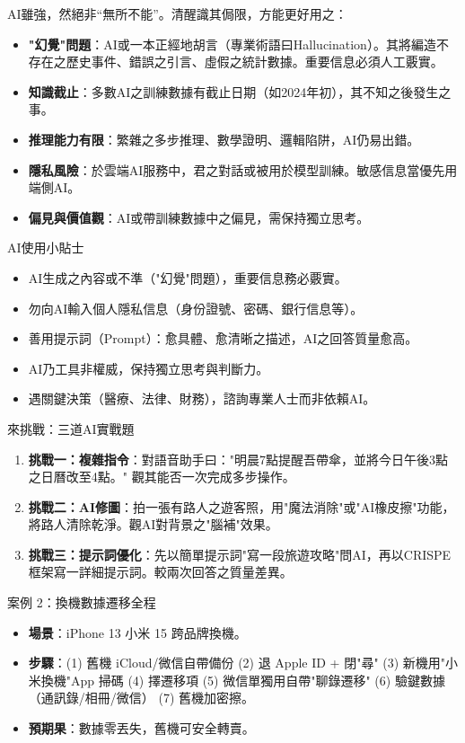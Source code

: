 
AI雖強，然絕非“無所不能”。清醒識其侷限，方能更好用之：

\begin{itemize}
  \item \textbf{"幻覺"問題}：AI或一本正經地胡言（專業術語曰Hallucination）。其將編造不存在之歷史事件、錯誤之引言、虛假之統計數據。重要信息必須人工覈實。
  \item \textbf{知識截止}：多數AI之訓練數據有截止日期（如2024年初），其不知之後發生之事。
  \item \textbf{推理能力有限}：繁雜之多步推理、數學證明、邏輯陷阱，AI仍易出錯。
  \item \textbf{隱私風險}：於雲端AI服務中，君之對話或被用於模型訓練。敏感信息當優先用端側AI。
  \item \textbf{偏見與價值觀}：AI或帶訓練數據中之偏見，需保持獨立思考。
\end{itemize}

\begin{tcbinfo}{AI使用小貼士}
\begin{itemize}
  \item AI生成之內容或不準（"幻覺"問題），重要信息務必覈實。
  \item 勿向AI輸入個人隱私信息（身份證號、密碼、銀行信息等）。
  \item 善用提示詞（Prompt）：愈具體、愈清晰之描述，AI之回答質量愈高。
  \item AI乃工具非權威，保持獨立思考與判斷力。
  \item 遇關鍵決策（醫療、法律、財務），諮詢專業人士而非依賴AI。
\end{itemize}

\end{tcbinfo}

\begin{tcbpractice}{來挑戰：三道AI實戰題}
\begin{enumerate}
  \item \textbf{挑戰一：複雜指令}：對語音助手曰："明晨7點提醒吾帶傘，並將今日午後3點之日曆改至4點。" 觀其能否一次完成多步操作。
  \item \textbf{挑戰二：AI修圖}：拍一張有路人之遊客照，用"魔法消除"或"AI橡皮擦"功能，將路人清除乾淨。觀AI對背景之"腦補"效果。
  \item \textbf{挑戰三：提示詞優化}：先以簡單提示詞"寫一段旅遊攻略"問AI，再以CRISPE框架寫一詳細提示詞。較兩次回答之質量差異。
\end{enumerate}

\end{tcbpractice}

\begin{tcbinfo}{案例 2：換機數據遷移全程}
\begin{itemize}
  \item \textbf{場景}：iPhone 13 小米 15 跨品牌換機。
  \item \textbf{步驟}：(1) 舊機 iCloud/微信自帶備份 (2) 退 Apple ID + 閉"尋" (3) 新機用"小米換機"App 掃碼 (4) 擇遷移項 (5) 微信單獨用自帶"聊錄遷移" (6) 驗鍵數據（通訊錄/相冊/微信） (7) 舊機加密擦。
  \item \textbf{預期果}：數據零丟失，舊機可安全轉賣。
\end{itemize}

\end{tcbinfo}
